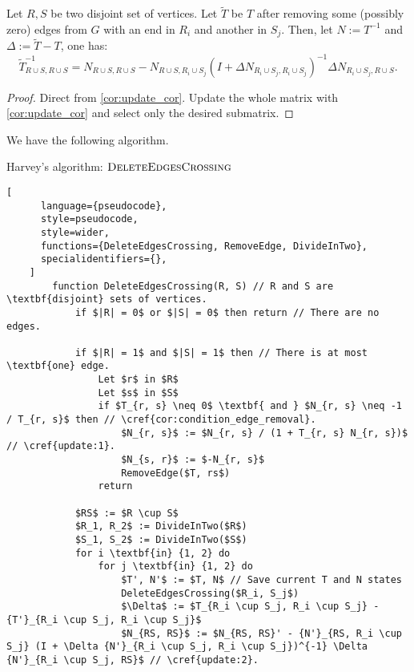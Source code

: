 \begin{theorem}[Update 2]
\label{update:2}
    Let \(R, S\) be two disjoint set of vertices. Let \(\tilde{T}\) be \(T\) after removing some (possibly zero) edges from \(G\) with an end in \(R_i\) and another in \(S_j\).
    Then, let \(N := T^{-1}\) and \(\Delta := \tilde{T} - T\), one has:
    \[
        {\tilde{T}}^{-1}_{R \cup S, R \cup S} = N_{R \cup S, R \cup S} - N_{R \cup S, R_i \cup S_j}(I + \Delta N_{R_i \cup S_j, R_i \cup S_j})^{-1} \Delta N_{R_i \cup S_j, R \cup S}.
    \]
\end{theorem}

\begin{proof}
    Direct from \cref{cor:update_cor}. Update the whole matrix with \ref{cor:update_cor} and select only the desired submatrix.
\end{proof}

We have the following algorithm.

\begin{programruledcaption}{Harvey's algorithm: \(\textsc{DeleteEdgesCrossing}\)}
    \begin{lstlisting}[
      language={pseudocode},
      style=pseudocode,
      style=wider,
      functions={DeleteEdgesCrossing, RemoveEdge, DivideInTwo},
      specialidentifiers={},
    ]
        function DeleteEdgesCrossing(R, S) // R and S are \textbf{disjoint} sets of vertices.
            if $|R| = 0$ or $|S| = 0$ then return // There are no edges.

            if $|R| = 1$ and $|S| = 1$ then // There is at most \textbf{one} edge.
                Let $r$ in $R$
                Let $s$ in $S$
                if $T_{r, s} \neq 0$ \textbf{ and } $N_{r, s} \neq -1 / T_{r, s}$ then // \cref{cor:condition_edge_removal}.
                    $N_{r, s}$ := $N_{r, s} / (1 + T_{r, s} N_{r, s})$ // \cref{update:1}.
                    $N_{s, r}$ := $-N_{r, s}$
                    RemoveEdge($T, rs$)
                return

            $RS$ := $R \cup S$
            $R_1, R_2$ := DivideInTwo($R$)
            $S_1, S_2$ := DivideInTwo($S$)
            for i \textbf{in} {1, 2} do
                for j \textbf{in} {1, 2} do
                    $T', N'$ := $T, N$ // Save current T and N states
                    DeleteEdgesCrossing($R_i, S_j$)
                    $\Delta$ := $T_{R_i \cup S_j, R_i \cup S_j} - {T'}_{R_i \cup S_j, R_i \cup S_j}$
                    $N_{RS, RS}$ := $N_{RS, RS}' - {N'}_{RS, R_i \cup S_j} (I + \Delta {N'}_{R_i \cup S_j, R_i \cup S_j})^{-1} \Delta {N'}_{R_i \cup S_j, RS}$ // \cref{update:2}.
    \end{lstlisting}
\end{programruledcaption}

